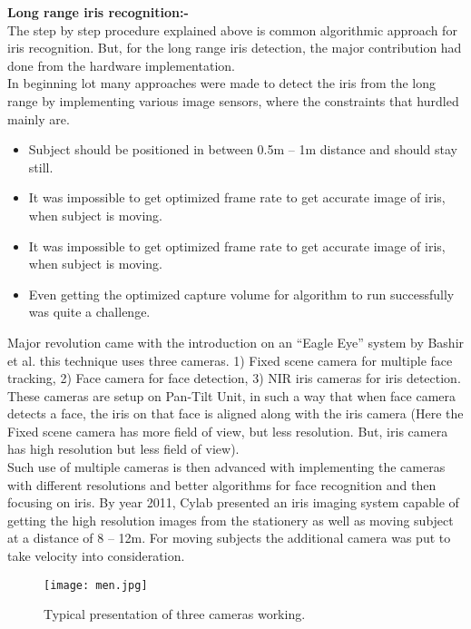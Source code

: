 \documentclass{report}
\begin{document}
\noindent \textbf{Long range iris recognition:-}\\
\noindent The step by step procedure explained above is common algorithmic approach for iris recognition. But, for the long range iris detection, the major contribution had done from the hardware implementation.\\
In beginning lot many approaches were made to detect the iris from the long range by implementing various image sensors, where the constraints that hurdled mainly are.\\
\begin{itemize}
    \item Subject should be positioned in between 0.5m – 1m distance and should stay still.
    \item It was impossible to get optimized frame rate to get accurate image of iris, when subject is moving.
    \item It was impossible to get optimized frame rate to get accurate image of iris, when subject is moving.
    \item  Even getting the optimized capture volume for algorithm to run successfully was quite a challenge.
\end{itemize}
\noindent Major revolution came with the introduction on an “Eagle Eye” system by Bashir et al. this technique uses three cameras. 1) Fixed scene camera for multiple face tracking, 2) Face camera for face detection, 3) NIR iris cameras for iris detection. These cameras are setup on Pan-Tilt Unit, in such a way that when face camera detects a face, the iris on that face is aligned along with the iris camera (Here the Fixed scene camera has more field of view, but less resolution. But, iris camera has high resolution but less field of view). \\

Such use of multiple cameras is then advanced with implementing the cameras with different resolutions and better algorithms for face recognition and then focusing on iris. By year 2011, Cylab presented an iris imaging system capable of getting the high resolution images from the stationery as well as moving subject at a distance of 8 – 12m. For moving subjects the additional camera was put to take velocity into consideration.\\
\begin{figure}
\begin{center}
    \texttt{[image: men.jpg]}
    \caption{Typical presentation of three cameras working.}
\end{center}
\end{figure}
\end{document}
